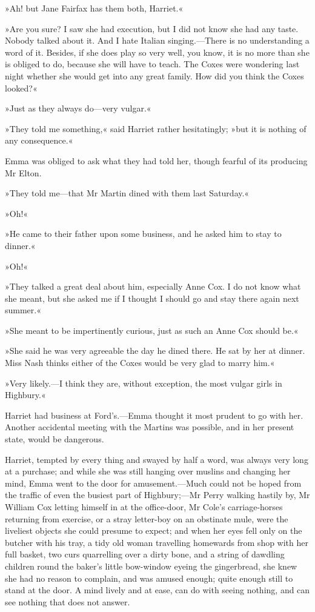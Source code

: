 »Ah! but Jane Fairfax has them both, Harriet.«

»Are you sure? I saw she had execution, but I did not know she had any taste. Nobody talked about it. And I hate Italian singing.—There is no understanding a word of it. Besides, if she does play so very well, you know, it is no more than she is obliged to do, because she will have to teach. The Coxes were wondering last night whether she would get into any great family. How did you think the Coxes looked?«

»Just as they always do—very vulgar.«

»They told me something,« said Harriet rather hesitatingly; »but it is nothing of any consequence.«

Emma was obliged to ask what they had told her, though fearful of its producing Mr Elton.

»They told me—that Mr Martin dined with them last Saturday.«

»Oh!«

»He came to their father upon some business, and he asked him to stay to dinner.«

»Oh!«

»They talked a great deal about him, especially Anne Cox. I do not know what she meant, but she asked me if I thought I should go and stay there again next summer.«

»She meant to be impertinently curious, just as such an Anne Cox should be.«

»She said he was very agreeable the day he dined there. He sat by her at dinner. Miss Nash thinks either of the Coxes would be very glad to marry him.«

»Very likely.—I think they are, without exception, the most vulgar girls in Highbury.«

Harriet had business at Ford's.—Emma thought it most prudent to go with her. Another accidental meeting with the Martins was possible, and in her present state, would be dangerous.

Harriet, tempted by every thing and swayed by half a word, was always very long at a purchase; and while she was still hanging over muslins and changing her mind, Emma went to the door for amusement.—Much could not be hoped from the traffic of even the busiest part of Highbury;—Mr Perry walking hastily by, Mr William Cox letting himself in at the office-door, Mr Cole's carriage-horses returning from exercise, or a stray letter-boy on an obstinate mule, were the liveliest objects she could presume to expect; and when her eyes fell only on the butcher with his tray, a tidy old woman travelling homewards from shop with her full basket, two curs quarrelling over a dirty bone, and a string of dawdling children round the baker's little bow-window eyeing the gingerbread, she knew she had no reason to complain, and was amused enough; quite enough still to stand at the door. A mind lively and at ease, can do with seeing nothing, and can see nothing that does not answer.

